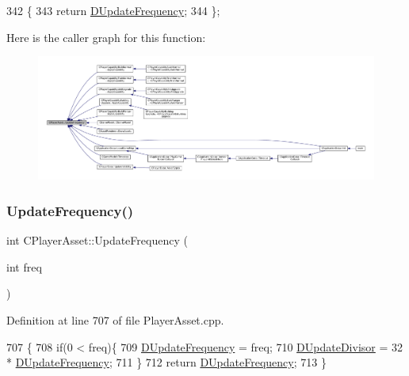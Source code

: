 \begin{DoxyCode}
342                                     \{
343             \textcolor{keywordflow}{return} \hyperlink{classCPlayerAsset_ade2147d67ec25b0280d5f11a89dd0dc5}{DUpdateFrequency};
344         \};
\end{DoxyCode}
Here is the caller graph for this function\+:\nopagebreak
\begin{figure}[H]
\begin{center}
\leavevmode
\includegraphics[width=350pt]{classCPlayerAsset_a0aff85b9552967a42f4f3f42cb59c19f_icgraph}
\end{center}
\end{figure}
\hypertarget{classCPlayerAsset_ad53a2f58bcbccb7995431e8e2d050c09}{}\label{classCPlayerAsset_ad53a2f58bcbccb7995431e8e2d050c09} 
\subsubsection{\texorpdfstring{Update\+Frequency()}{UpdateFrequency()}\hspace{0.1cm}{\footnotesize\ttfamily [2/2]}}
{\footnotesize\ttfamily int C\+Player\+Asset\+::\+Update\+Frequency (\begin{DoxyParamCaption}\item[{int}]{freq }\end{DoxyParamCaption})\hspace{0.3cm}{\ttfamily [static]}}



Definition at line 707 of file Player\+Asset.\+cpp.


\begin{DoxyCode}
707                                          \{
708     \textcolor{keywordflow}{if}(0 < freq)\{
709        \hyperlink{classCPlayerAsset_ade2147d67ec25b0280d5f11a89dd0dc5}{DUpdateFrequency} = freq;
710        \hyperlink{classCPlayerAsset_a09d17faf2ad70e2f778095a3c314d398}{DUpdateDivisor} = 32 * \hyperlink{classCPlayerAsset_ade2147d67ec25b0280d5f11a89dd0dc5}{DUpdateFrequency};
711     \}
712     \textcolor{keywordflow}{return} \hyperlink{classCPlayerAsset_ade2147d67ec25b0280d5f11a89dd0dc5}{DUpdateFrequency};
713 \}
\end{DoxyCode}


